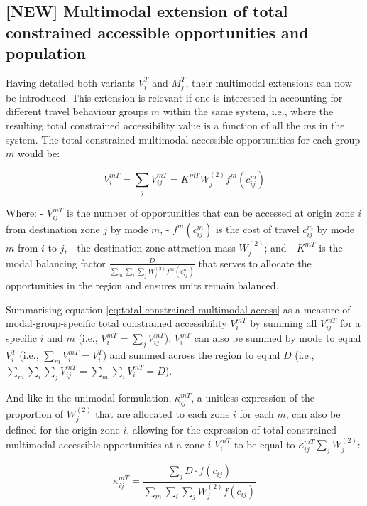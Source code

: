 \documentclass[
11pt, %
oneside, %
english, %
singlespacing, %
]{macthesis} %
\begin{document}
\subsection{{[}NEW{]} Multimodal extension of total constrained accessible opportunities and population}\label{new-multimodal-extension-of-total-constrained-accessible-opportunities-and-population}

Having detailed both variants \(V_i^T\) and \(M_j^T\), their multimodal extensions can now be introduced. This extension is relevant if one is interested in accounting for different travel behaviour groups \(m\) within the same system, i.e., where the resulting total constrained accessibility value is a function of all the \(m\)s in the system. The total constrained multimodal accessible opportunities for each group \(m\) would be:

\begin{equation}
\label{eq:total-constrained-multimodal-access}
V^{mT}_{i} = \sum_j V^{mT}_{ij} = K^{mT} W_j^{(2)} f^m(c^m_{ij})
\end{equation} 

Where:
- \(V^{mT}_{ij}\) is the number of opportunities that can be accessed at origin zone \(i\) from destination zone \(j\) by mode \(m\),
- \(f^m(c^m_{ij})\) is the cost of travel \(c^m_{ij}\) by mode \(m\) from \(i\) to \(j\),
- the destination zone attraction mass \(W_j^{(2)}\); and
- \(K^{mT}\) is the modal balancing factor \(\frac{D}{\sum_m\sum_i\sum_j W^{(2)}_jf^m(c^m_{ij})}\) that serves to allocate the opportunities in the region and ensures units remain balanced.

Summarising equation \ref{eq:total-constrained-multimodal-access} as a measure of modal-group-specific total constrained accessibility \(V^{mT}_i\) by summing all \(V^{mT}_{ij}\) for a specific \(i\) and \(m\) (i.e., \(V^{mT}_i = \sum_j V^{mT}_{ij}\)). \(V^{mT}_i\) can also be summed by mode to equal \(V^{T}_i\) (i.e., \(\sum_m V^{mT}_i = V^{T}_i\)) and summed across the region to equal \(D\) (i.e., \(\sum_m\sum_i\sum_j V^{mT}_{ij} = \sum_m\sum_i V^{mT}_{i} = D\)).

And like in the unimodal formulation, \(\kappa_{ij}^{mT}\), a unitless expression of the proportion of \(W^{(2)}_j\) that are allocated to each zone \(i\) for each \(m\), can also be defined for the origin zone \(i\), allowing for the expression of total constrained multimodal accessible opportunities at a zone \(i\) \(V^{mT}_i\) to be equal to \(\kappa_{ij}^{mT}\sum_j W^{(2)}_j\):

\[
\kappa_{ij}^{mT} = \frac{\sum_j D\cdot f(c_{ij})}{\sum_m\sum_i\sum_j W^{(2)}_jf(c_{ij})}
\]
\end{document}
